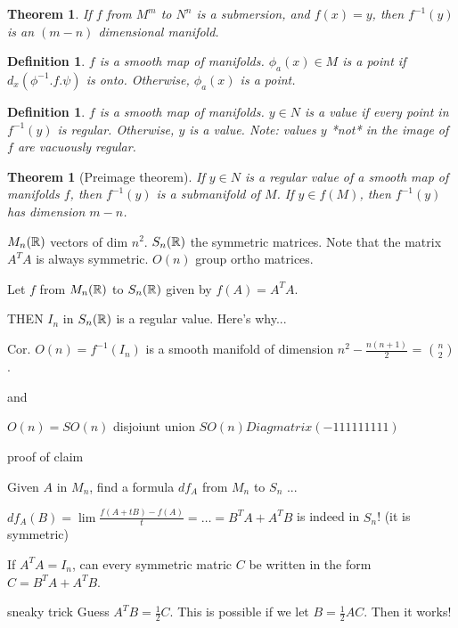 \documentclass[11pt]{amsbook}
\theoremstyle{mystyle} %
\newtheorem{thrm}[thm]{Theorem}
\newtheorem{defi}[thm]{Definition}
\numberwithin{thm}{section}
\begin{document}
\begin{thrm}
	If $f$ from $M^m$ to $N^n$ is a submersion, and $f(x) = y$, then $f^{-1}(y)$ is an $(m-n)$ dimensional manifold.
\end{thrm}

\begin{defi}
	$f$ is a smooth map of manifolds.
	$\phi_a(x) \in M$ is a  point if $d_x(\phi^{-1}.f.\psi)$ is onto.  Otherwise, $\phi_a(x)$ is a  point.
\end{defi}

\begin{defi}
	$f$ is a smooth map of manifolds.
	$y \in N$ is a  value if every point in $f^{-1}(y)$ is regular.  Otherwise, $y$ is a  value.  Note: values $y$ *not* in the image of $f$ are vacuously regular.
\end{defi}

\begin{thrm}[Preimage theorem]
	If $y \in N$ is a regular value of a smooth map of manifolds $f$, then $f^{-1}(y)$ is a submanifold of $M$.  If $y \in f(M)$, then $f^{-1}(y)$ has dimension $m-n$.
\end{thrm}

\begin{example}
	$M_n({\mathbb R})$ vectors of dim $n^2$.  $S_n({\mathbb R})$ the symmetric matrices.  Note that the matrix $A^T A$ is always symmetric.  $O(n)$ group ortho matrices.

	Let $f$ from $M_n({\mathbb R})$ to $S_n({\mathbb R})$ given by $f(A) = A^T A$.

	THEN $I_n$ in $S_n({\mathbb R})$ is a regular value.  Here's why...

	Cor. $O(n) = f^{-1}(I_n)$ is a smooth manifold of dimension $n^2 - \frac{n(n+1)}{2}$ = $\binom n2$.

	and

	$O(n) = SO(n)$ disjoiunt union $SO(n)Diagmatrix(-1 1 1 1 1 1 1 1 1)$

	proof of claim

	Given $A$ in $M_n$, find a formula $df_A$ from $M_n$ to $S_n$ ...

	$df_A(B) = \lim \frac{f(A+tB) - f(A)}{t} = \ldots = B^T A + A^T B$
	is indeed in $S_n$! (it is symmetric)

	If $A^T A = I_n$, can every symmetric matric $C$ be written in the form $C = B^T A + A^T B$.

	sneaky trick
	Guess $A^T B = \frac12 C$.
	This is possible if we let $B = \frac12 AC$.
	Then it works!
\end{example}
\end{document}
